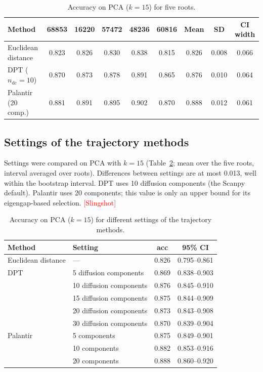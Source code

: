 \documentclass[10pt,a4paper,twocolumn]{article}
\newcommand{\todo}[1]{\textcolor{red}{[#1]}}
\begin{document}
\begin{table}[t]
\centering\small
\caption{Accuracy on PCA ($k=15$) for five roots.}
\label{tab:roots}
\setlength{\tabcolsep}{3.5pt}
\begin{tabular}{lcccccccc}
\toprule
Method & 68853 & 16220 & 57472 & 48236 & 60816 & Mean & SD & CI width \\
\midrule
Euclidean distance       & 0.823 & 0.826 & 0.830 & 0.838 & 0.815 & 0.826 & 0.008 & 0.066 \\
DPT ($n_{\mathrm{dc}}=10$) & 0.870 & 0.873 & 0.878 & 0.891 & 0.865 & 0.876 & 0.010 & 0.064 \\
Palantir (20 comp.)      & 0.881 & 0.891 & 0.895 & 0.902 & 0.870 & 0.888 & 0.012 & 0.061 \\
\bottomrule
\end{tabular}
\end{table}

\subsection{Settings of the trajectory methods}
Settings were compared on PCA with $k=15$ (Table~\ref{tab:settings}; mean over the five roots,
interval averaged over roots). Differences between settings are at most 0.013, well within the
bootstrap interval. DPT uses 10 diffusion components (the Scanpy default). Palantir uses 20
components; this value is only an upper bound for its eigengap-based selection.
\todo{Slingshot}

\begin{table}[t]
\centering\small
\caption{Accuracy on PCA ($k=15$) for different settings of the trajectory methods.}
\label{tab:settings}
\begin{tabular}{llcc}
\toprule
Method & Setting & acc & 95\% CI \\
\midrule
Euclidean distance & --- & 0.826 & 0.795--0.861 \\
\midrule
DPT & 5 diffusion components  & 0.869 & 0.838--0.903 \\
    & 10 diffusion components & 0.876 & 0.845--0.910 \\
    & 15 diffusion components & 0.875 & 0.844--0.909 \\
    & 20 diffusion components & 0.873 & 0.843--0.908 \\
    & 30 diffusion components & 0.870 & 0.839--0.904 \\
\midrule
Palantir & 5 components  & 0.875 & 0.849--0.901 \\
         & 10 components & 0.882 & 0.853--0.916 \\
         & 20 components & 0.888 & 0.860--0.920 \\
\bottomrule
\end{tabular}
\end{table}
\end{document}
